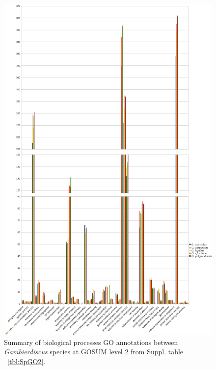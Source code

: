 \documentclass[12pt]{article}
\begin{document}
\begin{figure} 
\includegraphics[scale=.45]{3Aug18_cluster-investigation/figures/gosum-species/Species-gosum2-bio2-split.png} 
\caption{Summary of biological processes GO annotations between \textit{Gambierdiscus} species at GOSUM level 2 from Suppl. table ~\ref{tbl:SpGO2}.} 
\label{fig:SpecGo2Bio}
\end{figure} 
\end{document}

